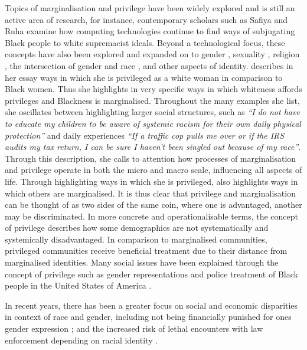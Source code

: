 Topics of marginalisation and privilege have been widely explored and is still an active area of research, for instance, contemporary scholars such as Safiya \citet{Noble:2018} and Ruha \citet{Benjamin:2019} examine how computing technologies continue to find ways of subjugating Black people to white supremacist ideals.
Beyond a technological focus, these concepts have also been explored and expanded on to gender \citep{Beauvoir:1953,Butler:1990,McIntosh:1988}, sexuality \citep{mccready_understanding_2004}, religion \citep{Beaman:2003}, the intersection of gender and race \citep{Crenshaw:1989,Voigt:2017}, and other aspects of identity.
\citet{McIntosh:1988} describes in her essay ways in which she is privileged as a white woman in comparison to Black women. Thus she highlights in very specific ways in which whiteness affords privileges and Blackness is marginalised.
Throughout the many examples she list, she oscillates between highlighting larger social structures, such as \textit{``I do not have to educate my children to be aware of systemic racism for their own daily physical protection''} and daily experiences \textit{``If a traffic cop pulls me over or if the IRS audits my tax return, I can be sure I haven't been singled out because of my race''}.
Through this description, she calls to attention how processes of marginalisation and privilege operate in both the micro and macro scale, influencing all aspects of life.
Through highlighting ways in which she is privileged, \citet{McIntosh:1988} also highlights ways in which others are marginalised.
It is thus clear that privilege and marginalisation can be thought of as two sides of the same coin, where one is advantaged, another may be discriminated.
In more concrete and operationalisable terms, the concept of privilege describes how some demographics are not systematically and systemically disadvantaged.
In comparison to marginalised communities, privileged communities receive beneficial treatment due to their distance from marginalised identities.
Many social issues have been explained through the concept of privilege such as gender representations \citep{Butler:1990} and police treatment of Black people in the United States of America \citep{Voigt:2017}.

In recent years, there has been a greater focus on social and economic disparities in context of race and gender, including not being financially punished for ones gender expression \citep{Lombardi:2002}; and the increased risk of lethal encounters with law enforcement depending on racial identity \citep{Zack:2015}.

